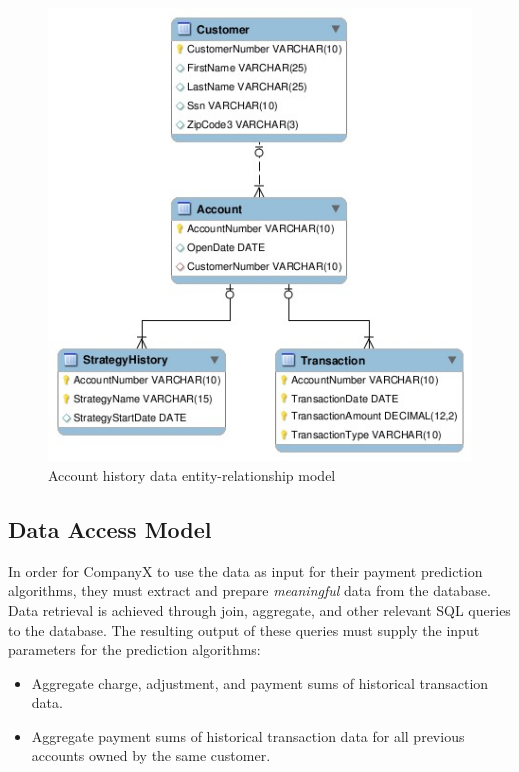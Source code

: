 \begin{figure}[ht]
\begin{center}
\includegraphics[width=\textwidth]{../images/account-history-schema.jpg}
\end{center}
\caption{Account history data entity-relationship model}
\label{fig:eer-model}
\end{figure}

\subsection{Data Access Model}
In order for CompanyX to use the data as input for their payment prediction algorithms, they must extract and prepare \textit{meaningful} data from the database. Data retrieval is achieved through join, aggregate, and other relevant SQL queries to the database. The resulting output of these queries must supply the input parameters for the prediction algorithms:
\begin{itemize}
 \item Aggregate charge, adjustment, and payment sums of historical transaction data.
 \item Aggregate payment sums of historical transaction data for all previous accounts owned by the same customer.
\end{itemize}

